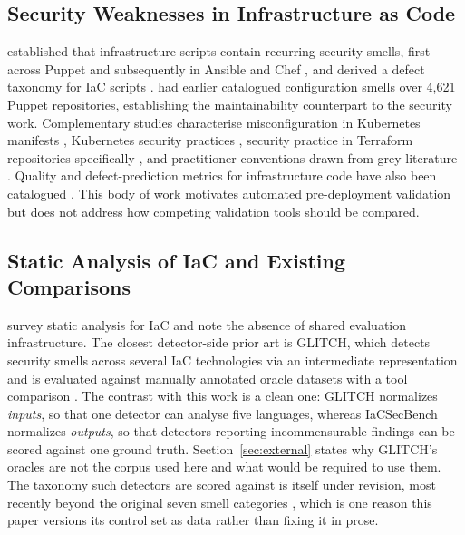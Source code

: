 \documentclass[smallextended]{svjour3}
\begin{document}
\subsection{Security Weaknesses in Infrastructure as Code}
\citet{rahman2019sins} established that infrastructure scripts contain recurring
security smells, first across Puppet and subsequently in Ansible and Chef
\citep{rahman2021replication}, and derived a defect taxonomy for IaC scripts
\citep{rahman2020gang}. \citet{sharma2016smell} had earlier catalogued
configuration smells over 4,621 Puppet repositories, establishing the
maintainability counterpart to the security work. Complementary studies
characterise misconfiguration in Kubernetes manifests \citep{rahman2023k8s},
Kubernetes security practices \citep{shamim2020xi}, security practice in Terraform repositories specifically
\citep{verdet2023exploring, verdet2025adoption}, and practitioner conventions
drawn from grey literature \citep{kumara2021dos}. Quality and defect-prediction
metrics for infrastructure code have also been catalogued
\citep{dallapalma2020catalog, dallapalma2022within}. This body of work motivates
automated pre-deployment validation but does not address how competing validation
tools should be compared.

\subsection{Static Analysis of IaC and Existing Comparisons}
\citet{chiari2022static} survey static analysis for IaC and note the absence of
shared evaluation infrastructure. The closest detector-side prior art is GLITCH,
which detects security smells across several IaC technologies via an intermediate
representation and is evaluated against manually annotated oracle datasets with a
tool comparison \citep{saavedra2022glitch, saavedra2023polyglot}. The contrast
with this work is a clean one: GLITCH normalizes \emph{inputs}, so that one
detector can analyse five languages, whereas IaCSecBench normalizes
\emph{outputs}, so that detectors reporting incommensurable findings can be
scored against one ground truth. Section~\ref{sec:external} states why GLITCH's
oracles are not the corpus used here and what would be required to use them. The
taxonomy such detectors are scored against is itself under revision, most
recently beyond the original seven smell categories \citep{war2025taxonomy},
which is one reason this paper versions its control set as data rather than
fixing it in prose.
\end{document}
